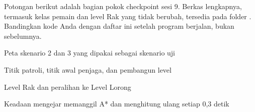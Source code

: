 Potongan berikut adalah bagian pokok checkpoint sesi 9. Berkas lengkapnya,
termasuk kelas pemain dan level Rak yang tidak berubah, tersedia pada folder
. Bandingkan kode Anda dengan daftar ini setelah program
berjalan, bukan sebelumnya.

  {Peta skenario 2 dan 3 yang dipakai sebagai skenario uji}

  {Titik patroli, titik awal penjaga, dan pembangun level}

  {Level Rak dan peralihan ke Level Lorong}

  {Keadaan mengejar memanggil A* dan menghitung ulang setiap 0,3 detik}



